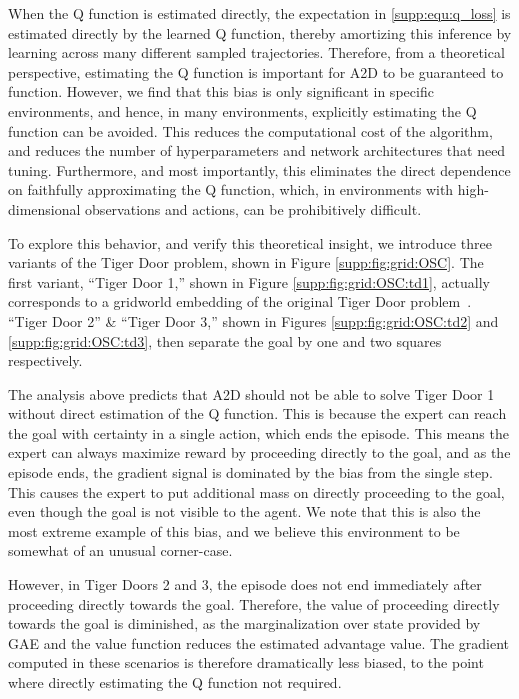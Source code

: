 When the Q function is estimated directly, the expectation in \eqref{supp:equ:q_loss} is estimated directly by the learned Q function, thereby amortizing this inference by learning across many different sampled trajectories.  Therefore, from a theoretical perspective, estimating the Q function is important for A2D to be guaranteed to function.  However, we find that this bias is only significant in specific environments, and hence, in many environments, explicitly estimating the Q function can be avoided.  This reduces the computational cost of the algorithm, and reduces the number of hyperparameters and network architectures that need tuning.  Furthermore, and most importantly, this eliminates the direct dependence on faithfully approximating the Q function, which, in environments with high-dimensional observations and actions, can be prohibitively difficult.  

To explore this behavior, and verify this theoretical insight, we introduce three variants of the Tiger Door problem, shown in Figure \ref{supp:fig:grid:OSC}.  The first variant, ``Tiger Door 1,'' shown in Figure \ref{supp:fig:grid:OSC:td1}, actually corresponds to a gridworld embedding of the original Tiger Door problem~\citep{littman1995pomdp}.  ``Tiger Door 2'' \& ``Tiger Door 3,'' shown in Figures \ref{supp:fig:grid:OSC:td2} and \ref{supp:fig:grid:OSC:td3}, then separate the goal by one and two squares respectively.  

The analysis above predicts that A2D should not be able to solve Tiger Door 1 without direct estimation of the Q function.  This is because the expert can reach the goal with certainty in a single action, which ends the episode.  This means the expert can always maximize reward by proceeding directly to the goal, and as the episode ends, the gradient signal is dominated by the bias from the single step.  This causes the expert to put additional mass on directly proceeding to the goal, even though the goal is not visible to the agent.  We note that this is also the most extreme example of this bias, and we believe this environment to be somewhat of an unusual corner-case.  

However, in Tiger Doors 2 and 3, the episode does not end immediately after proceeding directly towards the goal.  Therefore, the value of proceeding directly towards the goal is diminished, as the marginalization over state provided by GAE and the value function reduces the estimated advantage value.  The gradient computed in these scenarios is therefore dramatically less biased, to the point where directly estimating the Q function not required.  

